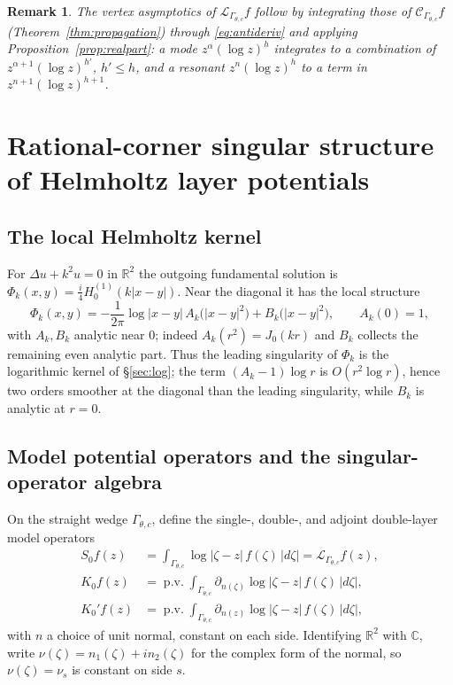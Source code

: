 \documentclass[pdflatex,sn-mathphys-num]{sn-jnl}%
\newcommand{\C}{\mathbb{C}}
\newcommand{\R}{\mathbb{R}}
\newcommand{\Cau}{\mathcal{C}}
\newcommand{\Lop}{\mathcal{L}}
\newcommand{\Gw}{\Gamma_{\theta,c}}
\theoremstyle{thmstyleone}
\theoremstyle{thmstyletwo}
\newtheorem{remark}{Remark}
\theoremstyle{thmstylethree}
\begin{document}
\begin{remark}
The vertex asymptotics of $\Lop_{\Gw}f$ follow by integrating those of
$\Cau_{\Gw}f$ (Theorem~\ref{thm:propagation}) through \eqref{eq:antideriv} and
applying Proposition~\ref{prop:realpart}: a mode $z^{\alpha}(\log z)^{h}$
integrates to a combination of $z^{\alpha+1}(\log z)^{h'}$, $h'\le h$, and a
resonant $z^{n}(\log z)^{h}$ to a term in $z^{n+1}(\log z)^{h+1}$.
\end{remark}

\section{Rational-corner singular structure of Helmholtz layer potentials}
\label{sec:helmholtz}

\subsection{The local Helmholtz kernel}
For $\Delta u+k^{2}u=0$ in $\R^{2}$ the outgoing fundamental solution is
$\Phi_k(x,y)=\tfrac{i}{4}H_0^{(1)}(k|x-y|)$. Near the diagonal it has the local
structure
\begin{equation}\label{eq:phi-local}
  \Phi_k(x,y)
  =-\frac{1}{2\pi}\log|x-y|\,A_k\!\bigl(|x-y|^{2}\bigr)+B_k\!\bigl(|x-y|^{2}\bigr),
  \qquad A_k(0)=1,
\end{equation}
with $A_k,B_k$ analytic near $0$; indeed
$A_k(r^{2})=J_0(kr)$ and $B_k$ collects the remaining even analytic part. Thus
the leading singularity of $\Phi_k$ is the logarithmic kernel of
\S\ref{sec:log}; the term $(A_k-1)\log r$ is $O(r^{2}\log r)$, hence two orders
smoother at the diagonal than the leading singularity, while $B_k$ is analytic
at $r=0$.

\subsection{Model potential operators and the singular-operator algebra}
On the straight wedge $\Gw$, define the single-, double-, and adjoint
double-layer model operators
\begin{align}
  S_0 f(z)&=\int_{\Gw}\log|\zeta-z|\,f(\zeta)\,|d\zeta|=\Lop_{\Gw}f(z),\\
  K_0 f(z)&=\operatorname{p.v.}\!\int_{\Gw}
     \partial_{n(\zeta)}\log|\zeta-z|\,f(\zeta)\,|d\zeta|,\\
  K_0' f(z)&=\operatorname{p.v.}\!\int_{\Gw}
     \partial_{n(z)}\log|\zeta-z|\,f(\zeta)\,|d\zeta|,
\end{align}
with $n$ a choice of unit normal, constant on each side. Identifying $\R^2$ with
$\C$, write $\nu(\zeta)=n_1(\zeta)+in_2(\zeta)$ for the complex form of the
normal, so $\nu(\zeta)=\nu_s$ is constant on side $s$.
\end{document}

